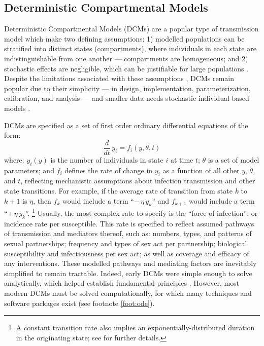 \subsection{Deterministic Compartmental Models}\label{intro.model.dcm}
Deterministic Compartmental Models (DCMs) are
a popular type of transmission model which make two defining assumptions:
1) modelled populations can be stratified into distinct states (compartments), where
   individuals in each state are indistinguishable from one another
   --- \ie compartments are homogeneous; and
2) stochastic effects are negligible,
   which can be justifiable for large populations \cite{Isham1988}.
Despite the limitations associated with these assumptions \cite{Liljeros2003,Johnson2016mf},
DCMs remain popular due to their simplicity
--- in design, implementation, parameterization, calibration, and analysis ---
and smaller data needs \vs stochastic individual-based models \cite{Garnett2011,Johnson2016mf}.
\par %
DCMs are specified as a set of first order ordinary differential equations of the form:
\begin{equation}
  \frac{d}{dt}\,y_i = f_i(y,\theta,t)
\end{equation} where:
$y_i(y)$ is the number of individuals in state $i$ at time $t$;
$\theta$ is a set of model parameters; and
$f_i$ defines the rate of change in $y_i$ as a function of all other $y$, $\theta$, and $t$,
reflecting mechanistic assumptions about infection transmission and other state transitions.
For example, if the average rate of transition from state $k$ to $k+1$ is $\eta$,
then $f_k$ would include a term ``$-\,\eta\,y_k$''
and $f_{k+1}$ would include a term ``$+\,\eta\,y_k$''.%
\footnote{A constant transition rate also implies an exponentially-distributed duration
  in the originating state; see  for further details.}
Usually, the most complex rate to specify is
the ``force of infection'', or incidence rate per susceptible.
This rate is specified to reflect assumed pathways of transmission and mediators thereof, such as:
numbers, types, and patterns of sexual partnerships;
frequency and types of sex act per partnership;
biological susceptibility and infectiousness per sex act; as well as
coverage and efficacy of any interventions.
These modelled pathways and mediating factors are inevitably simplified to remain tractable.
Indeed, early DCMs were simple enough to solve analytically,
which helped establish fundamental principles \cite{Hethcote2000}.
However, most modern DCMs must be solved computationally,
for which many techniques and software packages exist (\eg see footnote \ref{foot:ode}).
